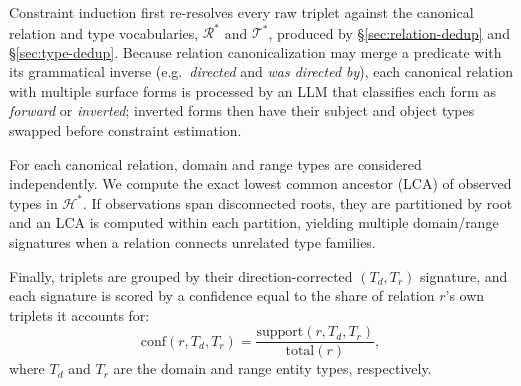 \documentclass[11pt]{article}
\begin{document}


Constraint induction first re-resolves every raw triplet against the canonical relation and type vocabularies, $\mathcal{R}^*$ and $\mathcal{T}^*$, produced by \S\ref{sec:relation-dedup} and \S\ref{sec:type-dedup}. Because relation canonicalization may merge a predicate with its grammatical inverse (e.g.\ \emph{directed} and \emph{was directed by}), each canonical relation with multiple surface forms is processed by an LLM that classifies each form as \emph{forward} or \emph{inverted}; inverted forms then have their subject and object types swapped before constraint estimation.

For each canonical relation, domain and range types are considered independently. We compute the exact lowest common ancestor (LCA) of observed types in $\mathcal{H}^*$. If observations span disconnected roots, they are partitioned by root and an LCA is computed within each partition, yielding multiple domain/range signatures when a relation connects unrelated type families.

Finally, triplets are grouped by their direction-corrected $(T_d,T_r)$ signature, and each signature is scored by a confidence equal to the share of relation $r$'s own triplets it accounts for:
\begin{equation}
\mathrm{conf}(r,T_d,T_r)=
\frac{\mathrm{support}(r,T_d,T_r)}{\mathrm{total}(r)},
\end{equation}
where $T_d$ and $T_r$ are the domain and range entity types, respectively.
\end{document}
